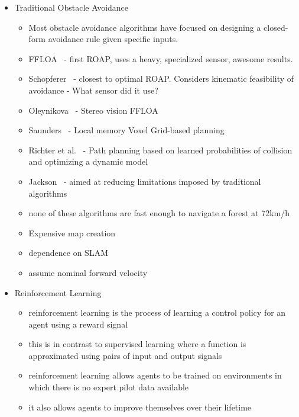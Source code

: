 \documentclass[paper=a4, fontsize=11pt]{scrartcl} %
\begin{document}
\begin{itemize}
\item Traditional Obstacle Avoidance
	\begin{itemize}
		\item Most obstacle avoidance algorithms have focused on designing a closed-form avoidance rule given specific inputs.
		\item FFLOA~\cite{Scherer2007} - first ROAP, uses a heavy, specialized sensor, awesome results.
		\item Schopferer~\cite{Schopferer2014} - closest to optimal ROAP.  Considers kinematic feasibility of avoidance - What sensor did it use?
		\item Oleynikova~\cite{Oleynikova2015} - Stereo vision FFLOA
		\item Saunders~\cite{Saunders2009} - Local memory Voxel Grid-based planning
		\item Richter et al.~\cite{Richter2014} - Path planning based on learned probabilities of collision and optimizing a dynamic model
		\item Jackson~\cite{CEPA} - aimed at reducing limitations imposed by traditional algorithms
		\item none of these algorithms are fast enough to navigate a forest at 72km/h
		\item Expensive map creation
		\item dependence on SLAM
		\item assume nominal forward velocity
	\end{itemize}

\item  Reinforcement Learning
	\begin{itemize}
		\item reinforcement learning is the process of learning a control policy for an agent using a reward signal
		\item this is in contrast to supervised learning where a function is approximated using pairs of input and output signals
		\item reinforcement learning allows agents to be trained on environments in which there is no expert pilot data available
		\item it also allows agents to improve themselves over their lifetime \cite{thrun1995lifelong}


\end{itemize}
\end{itemize}
\end{document}
